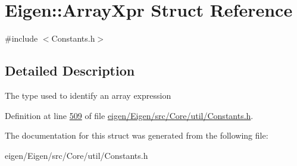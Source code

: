 \hypertarget{struct_eigen_1_1_array_xpr}{}\section{Eigen\+:\+:Array\+Xpr Struct Reference}
\label{struct_eigen_1_1_array_xpr}


{\ttfamily \#include $<$Constants.\+h$>$}



\subsection{Detailed Description}
The type used to identify an array expression 

Definition at line \hyperlink{eigen_2_eigen_2src_2_core_2util_2_constants_8h_source_l00509}{509} of file \hyperlink{eigen_2_eigen_2src_2_core_2util_2_constants_8h_source}{eigen/\+Eigen/src/\+Core/util/\+Constants.\+h}.



The documentation for this struct was generated from the following file\+:\begin{DoxyCompactItemize}
\item 
eigen/\+Eigen/src/\+Core/util/\+Constants.\+h\end{DoxyCompactItemize}
